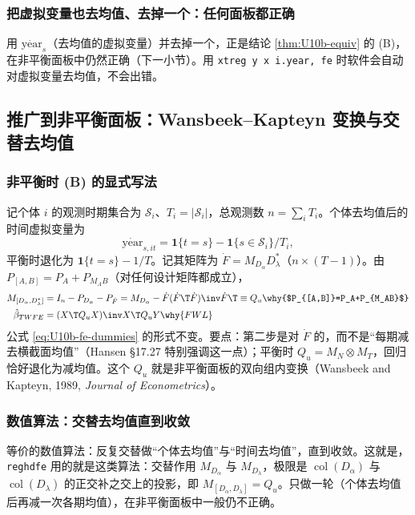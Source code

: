 \subsubsection{把虚拟变量也去均值、去掉一个：任何面板都正确}

用 $\dot{\mathrm{year}}_s$（去均值的虚拟变量）并去掉一个，正是结论 \ref{thm:U10b-equiv} 的 (B)，在非平衡面板中仍然正确（下一小节）。用 \texttt{xtreg y x i.year, fe} 时软件会自动对虚拟变量去均值，不会出错。

\subsection{推广到非平衡面板：Wansbeek--Kapteyn 变换与交替去均值}\label{sec:U10b-wk}

\subsubsection{非平衡时 (B) 的显式写法}

记个体 $i$ 的观测时期集合为 $\mathcal S_i$、$T_i=|\mathcal S_i|$，总观测数 $n=\sum_iT_i$。个体去均值后的时间虚拟变量为
\[
\dot{\mathrm{year}}_{s,it}=\mathbf 1\{t=s\}-\mathbf 1\{s\in\mathcal S_i\}/T_i,
\]
平衡时退化为 $\mathbf 1\{t=s\}-1/T$。记其矩阵为 $\dot F=M_{D_\alpha}D_\lambda^*$（$n\times(T-1)$）。由 $P_{[A,B]}=P_A+P_{M_AB}$（对任何设计矩阵都成立），
\begin{align*}
M_{[D_\alpha,D_\lambda^*]} &= I_n-P_{D_\alpha}-P_{\dot F}=M_{D_\alpha}-\dot F(\dot F\T\dot F)\inv\dot F\T\equiv Q_u \why{$P_{[A,B]}=P_A+P_{M_AB}$}\\
\hat\beta_{TWFE} &= (X\T Q_uX)\inv X\T Q_uY \why{FWL}
\end{align*}
公式 \eqref{eq:U10b-fe-dummies} 的形式不变。要点：第二步是对 $\dot F$ 的，而不是“每期减去横截面均值”（Hansen §17.27 特别强调这一点）；平衡时 $Q_u=M_N\otimes M_T$，回归恰好退化为减均值。这个 $Q_u$ 就是非平衡面板的双向组内变换（Wansbeek and Kapteyn, 1989, \emph{Journal of Econometrics}）。

\subsubsection{数值算法：交替去均值直到收敛}

等价的数值算法：反复交替做“个体去均值”与“时间去均值”，直到收敛。这就是，\texttt{reghdfe} 用的就是这类算法：交替作用 $M_{D_\alpha}$ 与 $M_{D_\lambda}$，极限是 $\operatorname{col}(D_\alpha)$ 与 $\operatorname{col}(D_\lambda)$ 的正交补之交上的投影，即 $M_{[D_\alpha,D_\lambda]}=Q_u$。只做一轮（个体去均值后再减一次各期均值），在非平衡面板中一般仍不正确。


